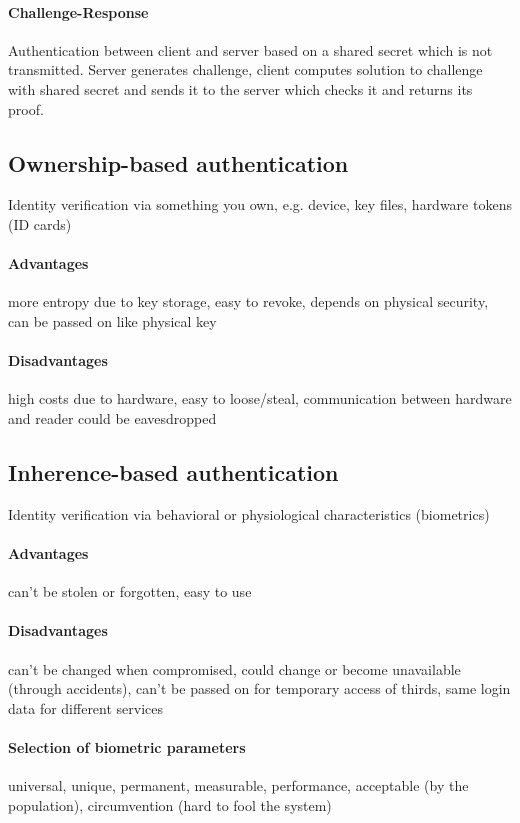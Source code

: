 \documentclass[12pt]{article}
\begin{document}
	\paragraph{Challenge-Response} Authentication between client and server based on a shared secret which is not transmitted. Server generates challenge, client computes solution to challenge with shared secret and sends it to the server which checks it and returns its proof.
	
	\subsection{Ownership-based authentication}
	Identity verification via something you own, e.g. device, key files, hardware tokens (ID cards)
	\paragraph{Advantages} more entropy due to key storage, easy to revoke, depends on physical security, can be passed on like physical key
	\paragraph{Disadvantages} high costs due to hardware, easy to loose/steal, communication between hardware and reader could be eavesdropped
	
	\subsection{Inherence-based authentication}
	Identity verification via behavioral or physiological characteristics (biometrics)
	\paragraph{Advantages} can't be stolen or forgotten, easy to use
	\paragraph{Disadvantages} can't be changed when compromised, could change or become unavailable (through accidents), can't be passed on for temporary access of thirds, same login data for different services
	\paragraph{Selection of biometric parameters} universal, unique, permanent, measurable, performance, acceptable (by the population), circumvention (hard to fool the system)
\end{document}
